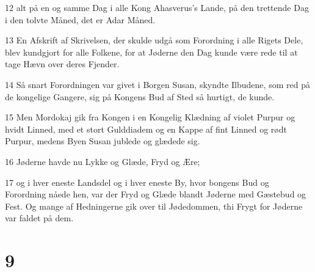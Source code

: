 \par 12 alt på en og samme Dag i alle Kong Ahasverus's Lande, på den trettende Dag i den tolvte Måned, det er Adar Måned.
\par 13 En Afskrift af Skrivelsen, der skulde udgå som Forordning i alle Rigets Dele, blev kundgjort for alle Folkene, for at Jøderne den Dag kunde være rede til at tage Hævn over deres Fjender.
\par 14 Så snart Forordningen var givet i Borgen Susan, skyndte Ilbudene, som red på de kongelige Gangere, sig på Kongens Bud af Sted så hurtigt, de kunde.
\par 15 Men Mordokaj gik fra Kongen i en Kongelig Klædning af violet Purpur og hvidt Linned, med et stort Gulddiadem og en Kappe af fint Linned og rødt Purpur, medens Byen Susan jublede og glædede sig.
\par 16 Jøderne havde nu Lykke og Glæde, Fryd og Ære;
\par 17 og i hver eneste Landsdel og i hver eneste By, hvor bongens Bud og Forordning nåede hen, var der Fryd og Glæde blandt Jøderne med Gæstebud og Fest. Og mange af Hedningerne gik over til Jødedommen, thi Frygt for Jøderne var faldet på dem.

\chapter{9}

